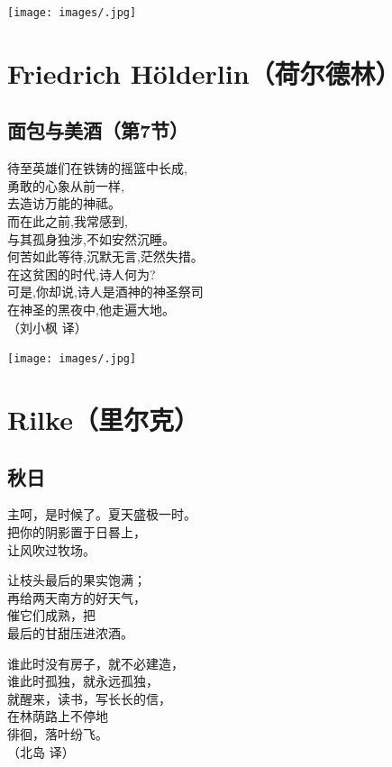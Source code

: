 \documentclass[
]{book}
\renewenvironment{quote}{\begin{VF}}{\end{VF}}
\begin{document}
\texttt{[image: images/.jpg]}

\hypertarget{friedrich-holderlin}{%
\chapter{Friedrich Hölderlin（荷尔德林）}\label{friedrich-holderlin}}

\hypertarget{section-59}{%
\section{面包与美酒（第7节）}\label{section-59}}

\begin{quote}
待至英雄们在铁铸的摇篮中长成,\\
勇敢的心象从前一样,\\
去造访万能的神祗。\\
而在此之前,我常感到,\\
与其孤身独涉,不如安然沉睡。\\
何苦如此等待,沉默无言,茫然失措。\\
在这贫困的时代,诗人何为?\\
可是,你却说,诗人是酒神的神圣祭司\\
在神圣的黑夜中,他走遍大地。\\
（刘小枫 译）
\end{quote}

\texttt{[image: images/.jpg]}

\hypertarget{rilke}{%
\chapter{Rilke（里尔克）}\label{rilke}}

\hypertarget{section-60}{%
\section{秋日}\label{section-60}}

\begin{quote}
主呵，是时候了。夏天盛极一时。\\
把你的阴影置于日晷上，\\
让风吹过牧场。

让枝头最后的果实饱满；\\
再给两天南方的好天气，\\
催它们成熟，把\\
最后的甘甜压进浓酒。

谁此时没有房子，就不必建造，\\
谁此时孤独，就永远孤独，\\
就醒来，读书，写长长的信，\\
在林荫路上不停地\\
徘徊，落叶纷飞。\\
（北岛 译）
\end{quote}
\end{document}

